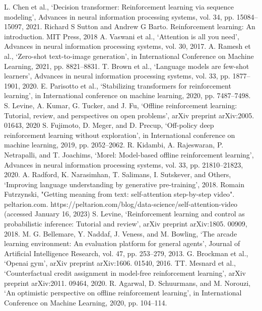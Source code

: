 \documentclass[conference]{IEEEtran}
\begin{document}
\begin{thebibliography}{00}
 L. Chen et al., ‘Decision transformer: Reinforcement learning via sequence modeling’,
Advances in neural information processing systems, vol. 34, pp. 15084–15097, 2021.
 Richard S Sutton and Andrew G Barto. Reinforcement learning: An introduction. MIT Press, 2018
A. Vaswani et al., ‘Attention is all you need’, Advances in neural information processing
systems, vol. 30, 2017.
 A. Ramesh et al., ‘Zero-shot text-to-image generation’, in International Conference on Machine Learning, 2021, pp. 8821–8831.
 T. Brown et al., ‘Language models are few-shot learners’, Advances in neural information
processing systems, vol. 33, pp. 1877–1901, 2020.
 E. Parisotto et al., ‘Stabilizing transformers for reinforcement learning’, in International conference on machine learning, 2020, pp. 7487–7498.
S. Levine, A. Kumar, G. Tucker, and J. Fu, ‘Offline reinforcement learning: Tutorial, review, and perspectives on open problems’, arXiv preprint arXiv:2005. 01643, 2020
 S. Fujimoto, D. Meger, and D. Precup, ‘Off-policy deep reinforcement learning without
exploration’, in International conference on machine learning, 2019, pp. 2052–2062.
R. Kidambi, A. Rajeswaran, P. Netrapalli, and T. Joachims, ‘Morel: Model-based offline
reinforcement learning’, Advances in neural information processing systems, vol. 33, pp.
21810–21823, 2020.
 A. Radford, K. Narasimhan, T. Salimans, I. Sutskever, and Others, ‘Improving language
understanding by generative pre-training’, 2018.
 Romain Futrzynski, "Getting meaning from text: self-attention step-by-step video". peltarion.com. https://peltarion.com/blog/data-science/self-attention-video (accessed January 16, 2023)
 S. Levine, ‘Reinforcement learning and control as probabilistic inference: Tutorial and review’, arXiv preprint arXiv:1805. 00909, 2018.
M. G. Bellemare, Y. Naddaf, J. Veness, and M. Bowling, ‘The arcade learning environment: An evaluation platform for general agents’, Journal of Artificial Intelligence Research, vol. 47, pp.
253–279, 2013.
G. Brockman et al., ‘Openai gym’, arXiv preprint arXiv:1606. 01540, 2016.
TT. Mesnard et al., ‘Counterfactual credit assignment in model-free reinforcement learning’,
arXiv preprint arXiv:2011. 09464, 2020.
R. Agarwal, D. Schuurmans, and M. Norouzi, ‘An optimistic perspective on offline
reinforcement learning’, in International Conference on Machine Learning, 2020, pp. 104–114.

\end{thebibliography}
\end{document}
